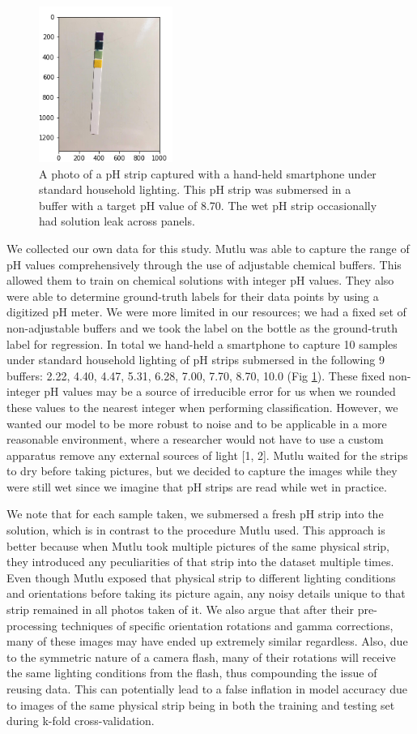 \documentclass[journal]{IEEEtran}
\begin{document}
\begin{figure}
\centering
\includegraphics[height=2in]{raw8p70_07.png}
\caption{A photo of a pH strip captured with a hand-held smartphone under standard household lighting. This pH strip was submersed in a buffer with a target pH value of 8.70. The wet pH strip occasionally had solution leak across panels.}
\label{raw_photo}
\end{figure}

We collected our own data for this study. Mutlu was able to capture the range of pH values comprehensively through the use of adjustable chemical buffers. This allowed them to train on chemical solutions with integer pH values. They also were able to determine ground-truth labels for their data points by using a digitized pH meter. We were more limited in our resources; we had a fixed set of non-adjustable buffers and we took the label on the bottle as the ground-truth label for regression. In total we hand-held a smartphone to capture 10 samples under standard household lighting of pH strips submersed in the following 9 buffers: 2.22, 4.40, 4.47, 5.31, 6.28, 7.00, 7.70, 8.70, 10.0 (Fig \ref{raw_photo}). These fixed non-integer pH values may be a source of irreducible error for us when we rounded these values to the nearest integer when performing classification. However, we wanted our model to be more robust to noise and to be applicable in a more reasonable environment, where a researcher would not have to use a custom apparatus remove any external sources of light [1, 2]. Mutlu waited for the strips to dry before taking pictures, but we decided to capture the images while they were still wet since we imagine that pH strips are read while wet in practice.

We note that for each sample taken, we submersed a fresh pH strip into the solution, which is in contrast to the procedure Mutlu used. This approach is better because when Mutlu took multiple pictures of the same physical strip, they introduced any peculiarities of that strip into the dataset multiple times. Even though Mutlu exposed that physical strip to different lighting conditions and orientations before taking its picture again, any noisy details unique to that strip remained in all photos taken of it. We also argue that after their pre-processing techniques of specific orientation rotations and gamma corrections, many of these images may have ended up extremely similar regardless. Also, due to the symmetric nature of a camera flash, many of their rotations will receive the same lighting conditions from the flash, thus compounding the issue of reusing data. This can potentially lead to a false inflation in model accuracy due to images of the same physical strip being in both the training and testing set during k-fold cross-validation.
\end{document}
